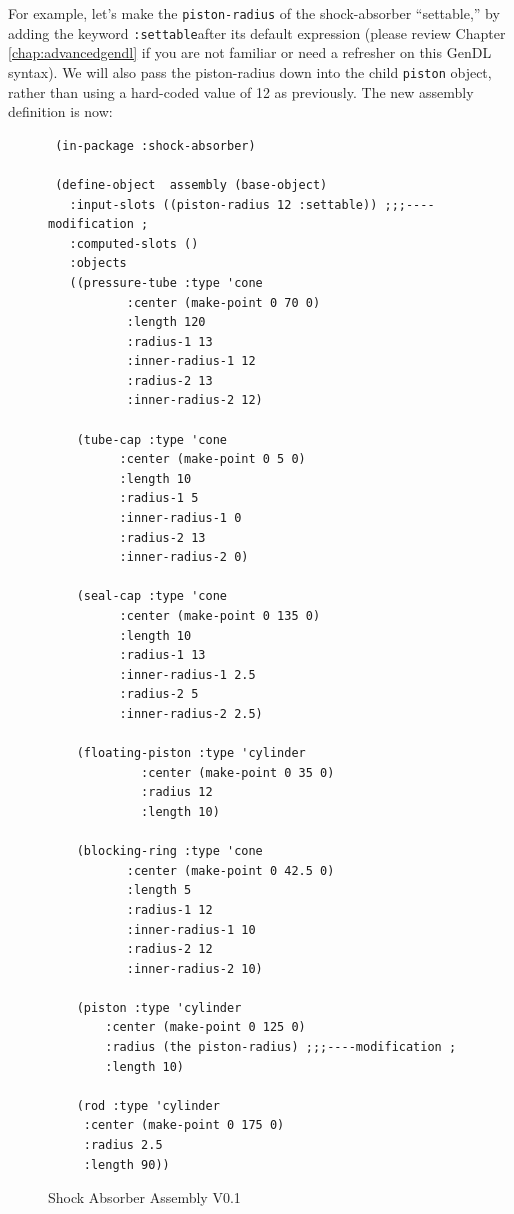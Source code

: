 \documentclass [11pt]{book}
\begin{document}
For example, let's make the \texttt{piston-radius} of the shock-absorber ``settable,'' by adding the keyword \texttt{:settable}after its default expression (please review Chapter 
\ref{chap:advancedgendl} if you are not familiar or need a refresher on this GenDL
syntax). We will also pass the piston-radius down into the child \texttt{piston} object, rather than using a hard-coded value of 12 as
previously. The new assembly definition is now:
\begin{figure}
\begin{lrbox}{\boxedverb}
\begin{minipage}{\linewidth}
{\small

\begin{verbatim}
 (in-package :shock-absorber)

 (define-object  assembly (base-object)
   :input-slots ((piston-radius 12 :settable)) ;;;----modification ;
   :computed-slots ()
   :objects 
   ((pressure-tube :type 'cone
		   :center (make-point 0 70 0)
		   :length 120
		   :radius-1 13
		   :inner-radius-1 12
		   :radius-2 13
		   :inner-radius-2 12)
   
    (tube-cap :type 'cone
	      :center (make-point 0 5 0)
	      :length 10
	      :radius-1 5
	      :inner-radius-1 0
	      :radius-2 13
	      :inner-radius-2 0)

    (seal-cap :type 'cone
	      :center (make-point 0 135 0)
	      :length 10
	      :radius-1 13
	      :inner-radius-1 2.5
	      :radius-2 5
	      :inner-radius-2 2.5)
   
    (floating-piston :type 'cylinder
		     :center (make-point 0 35 0)
		     :radius 12
		     :length 10)

    (blocking-ring :type 'cone
		   :center (make-point 0 42.5 0)
		   :length 5
		   :radius-1 12
		   :inner-radius-1 10
		   :radius-2 12
		   :inner-radius-2 10)
   
    (piston :type 'cylinder
	    :center (make-point 0 125 0)
	    :radius (the piston-radius) ;;;----modification ;
	    :length 10)
   
    (rod :type 'cylinder
	 :center (make-point 0 175 0)
	 :radius 2.5
	 :length 90))
\end{verbatim}}
\end{minipage}
\end{lrbox}
\fbox{\usebox{\boxedverb}}

\caption{Shock Absorber Assembly V0.1}

\label{fig:shockabsorberassemblyv01}

\end{figure}
\end{document}
